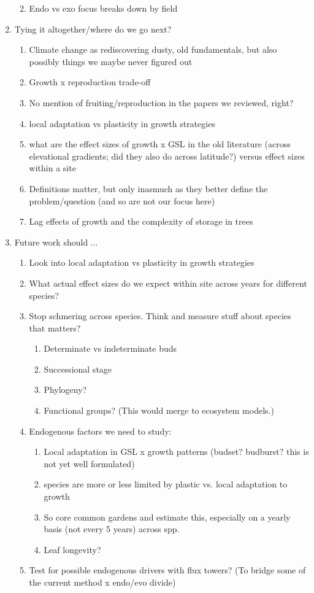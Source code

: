 \documentclass[11pt,letter]{article}
\begin{document}
\begin{enumerate}
\begin{enumerate}
\begin{enumerate}
\end{enumerate}
\item Endo vs exo focus breaks down by field
\end{enumerate}
\item Tying it altogether/where do we go next?
\begin{enumerate}
\item Climate change as rediscovering dusty, old fundamentals, but also possibly things we maybe never figured out
\item Growth x reproduction trade-off
\item No mention of fruiting/reproduction in the papers we reviewed, right?
\item local adaptation vs plasticity in growth strategies 
\item what are the effect sizes of growth x GSL in the old literature (across elevational gradients; did they also do across latitude?) versus effect sizes within a site 
\item Definitions matter, but only inasmuch as they better define the problem/question (and so are not our focus here)
\item Lag effects of growth and the complexity of storage in trees
\end{enumerate}
\item Future work should ...
\begin{enumerate}
\item Look into local adaptation vs plasticity in growth strategies
\item What actual effect sizes do we expect within site across years for different species?
\item Stop schmering across species. Think and measure stuff about species that matters?
\begin{enumerate}
\item Determinate vs indeterminate buds
\item Successional stage
\item Phylogeny? 
\item Functional groups? (This would merge to ecosystem models.)
\end{enumerate}
\item Endogenous factors we need to study: 
\begin{enumerate}
\item Local adaptation in GSL x growth patterns (budset? budburst? this is not yet well formulated)
\item species are more or less limited by plastic vs. local adaptation to growth
\item So core common gardens and estimate this, especially on a yearly basis (not every 5 years) across spp. 
\item Leaf longevity?
\end{enumerate}
\item Test for possible endogenous drivers with flux towers? (To bridge some of the current method x endo/evo divide)
\end{enumerate}
\end{enumerate}
\end{document}
